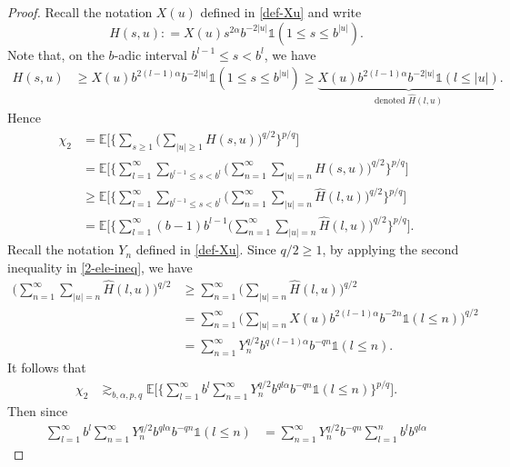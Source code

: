 \documentclass[12pt]{amsart}
\theoremstyle{definition}
\theoremstyle{remark}
\newcommand{\E}{\mathbb{E}}
\newcommand{\indi}{\mathds{1}}
\numberwithin{equation}{section}
\begin{document}
\begin{proof}
Recall the notation $X(u)$ defined in  \eqref{def-Xu} and write 
\[
H(s,u): = X(u)      s^{2 \alpha}   b^{-2|u|}  \indi(1\le s\le b^{|u|}).
\]
Note that, on the $b$-adic interval $b^{l-1}\le s<b^l$, we have
\begin{align*}
H(s,u) &\ge   X(u) b^{2(l-1)\alpha } b^{-2|u|} \indi(1 \le s \le b^{|u|})   \ge  \underbrace{X(u) b^{2(l-1)\alpha } b^{-2|u|} \indi(l\le |u|)}_{\text{denoted $\widehat{H}(l,u)$}}.
\end{align*}
Hence  
\begin{align*}
\chi_2 &= \E \Big[   \Big\{     \sum_{s \ge 1}       \Big(   \sum_{|u|\ge 1}    H(s,u)\Big)^{q/2}  \Big\}^{p/q}\Big]
\\
&  =  \E \Big[   \Big\{    \sum_{l= 1}^\infty \sum_{b^{l-1}\le s < b^l}       \Big(  \sum_{n=1}^\infty   \sum_{|u| =  n}    H(s,u) \Big)^{q/2}  \Big\}^{p/q}\Big]
\\
& \ge \E \Big[   \Big\{    \sum_{l= 1}^\infty \sum_{b^{l-1}\le s < b^l}       \Big(  \sum_{n=1}^\infty   \sum_{|u|  = n}    \widehat{H}(l,u) \Big)^{q/2}  \Big\}^{p/q}\Big]
\\
&  =   \E \Big[   \Big\{     \sum_{l= 1}^\infty  (b-1) b^{l-1} \Big(  \sum_{n=1}^\infty   \sum_{|u| = n}    \widehat{H}(l,u) \Big)^{q/2}  \Big\}^{p/q}\Big].
\end{align*}
Recall the notation $Y_n$ defined in \eqref{def-Xu}.  Since $q/2\ge 1$, by applying the second inequality in \eqref{2-ele-ineq}, we have
\begin{align*}
\Big(  \sum_{n=1}^\infty   \sum_{|u| = n }    \widehat{H}(l,u) \Big)^{q/2}  & \ge \sum_{n=1}^\infty \Big(\sum_{|u| = n }    \widehat{H}(l,u) \Big)^{q/2}
\\
& = \sum_{n=1}^\infty  \Big(  \sum_{|u|=n} X(u) b^{2(l-1)\alpha } b^{-2n} \indi(l\le n)\Big)^{q/2}
\\
& = \sum_{n=1}^\infty Y_n^{q/2} b^{q(l-1)\alpha } b^{-qn} \indi(l\le n). 
\end{align*}
It follows that 
\begin{align*}
\chi_2 & \gtrsim_{b, \alpha, p, q}  \E \Big[   \Big\{     \sum_{l= 1}^\infty   b^{l}   \sum_{n=1}^\infty  Y_n^{q/2} b^{ql\alpha } b^{-qn} \indi(l\le n)  \Big\}^{p/q}\Big].
\end{align*}
Then since 
\begin{align*}
\sum_{l= 1}^\infty   b^{l}   \sum_{n=1}^\infty  Y_n^{q/2} b^{ql\alpha } b^{-qn} \indi(l\le n)   &  =       \sum_{n=1}^\infty  Y_n^{q/2}   b^{-qn} \sum_{l= 1}^n  b^{l}  b^{ql\alpha }

\end{align*}
\end{proof}
\end{document}
